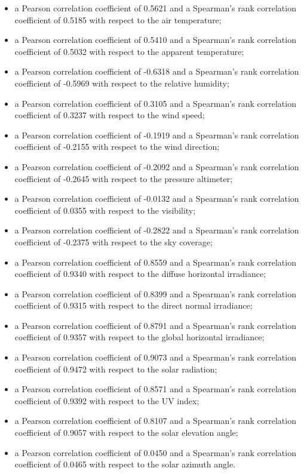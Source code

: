 \begin{itemize}
  \item a Pearson correlation coefficient of 0.5621 and a Spearman's rank correlation coefficient of 0.5185 with respect to the air temperature;
  \item a Pearson correlation coefficient of 0.5410 and a Spearman's rank correlation coefficient of 0.5032 with respect to the apparent temperature;
  \item a Pearson correlation coefficient of -0.6318 and a Spearman's rank correlation coefficient of -0.5969 with respect to the relative humidity;
  \item a Pearson correlation coefficient of 0.3105 and a Spearman's rank correlation coefficient of 0.3237 with respect to the wind speed;
  \item a Pearson correlation coefficient of -0.1919 and a Spearman's rank correlation coefficient of -0.2155 with respect to the wind direction;
  \item a Pearson correlation coefficient of -0.2092 and a Spearman's rank correlation coefficient of -0.2645 with respect to the pressure altimeter;
  \item a Pearson correlation coefficient of -0.0132 and a Spearman's rank correlation coefficient of 0.0355 with respect to the visibility;
  \item a Pearson correlation coefficient of -0.2822 and a Spearman's rank correlation coefficient of -0.2375 with respect to the sky coverage;
  \item a Pearson correlation coefficient of 0.8559 and a Spearman's rank correlation coefficient of 0.9340 with respect to the diffuse horizontal irradiance;
  \item a Pearson correlation coefficient of 0.8399 and a Spearman's rank correlation coefficient of 0.9315 with respect to the direct normal irradiance;
  \item a Pearson correlation coefficient of 0.8791 and a Spearman's rank correlation coefficient of 0.9357 with respect to the global horizontal irradiance;
  \item a Pearson correlation coefficient of 0.9073 and a Spearman's rank correlation coefficient of 0.9472 with respect to the solar radiation;
  \item a Pearson correlation coefficient of 0.8571 and a Spearman's rank correlation coefficient of 0.9392 with respect to the UV index;
  \item a Pearson correlation coefficient of 0.8107 and a Spearman's rank correlation coefficient of 0.9057 with respect to the solar elevation angle;
  \item a Pearson correlation coefficient of 0.0450 and a Spearman's rank correlation coefficient of 0.0465 with respect to the solar azimuth angle.
\end{itemize}
